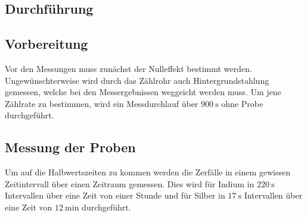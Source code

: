 \subsection{Durchführung}
\label{sec:durchführung}

\subsection{Vorbereitung}
Vor den Messungen muss zunächst der Nulleffekt bestimmt werden.
Ungewünschterweise wird durch das Zählrohr auch Hintergrundstahlung gemessen, welche bei den Messergebnissen weggeicht werden muss.
Um jene Zählrate zu bestimmen, wird ein Messdurchlauf über $\SI{900}{\second}$ ohne Probe durchgeführt.

\subsection{Messung der Proben}
Um auf die Halbwertszeiten zu kommen werden die Zerfälle in einem gewissen Zeitintervall über einen Zeitraum gemessen.
Dies wird für Indium in $\SI{220}{\second}$ Intervallen über eine Zeit von einer Stunde und für Silber in $\SI{17}{\second}$ Intervallen über eine Zeit von $\SI{12}{\minute}$ durchgeführt.
